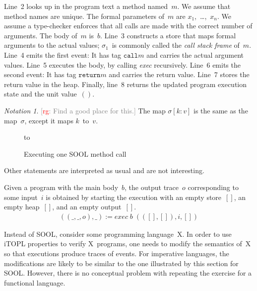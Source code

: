 \documentclass[preprint]{sigplanconf} %
\newcommand{\note}[2]{\textcolor{gray}{[\textcolor{red}{#1}: #2]}}
\newcommand{\rg}[1]{\note{rg}{#1}}
\theoremstyle{definition}
\theoremstyle{remark}
\newtheorem{notation}{Notation}
\begin{document}
Line~2 looks up in the program text a method named~$m$.
We assume that method names are unique.
The formal parameters of~$m$ are $x_1$,~\dots,~$x_n$.
We assume a type-checker enforces that all calls are made with the correct number of arguments.
The body of~$m$ is~$b$.
Line~3 constructs a store that maps formal arguments to the actual values;
$\sigma_1$~is commonly called the \emph{call stack frame} of~$m$.
Line~4 emits the first event:
It has tag $\mathtt{call}m$ and carries the actual argument values.
Line~5 executes the body, by calling \textit{exec} recursively.
Line~6 emits the second event:
It has tag $\mathtt{return}m$ and carries the return value.
Line~7 stores the return value in the heap.
Finally, line~8 returns the updated program execution state and the unit value~$()$.

\begin{notation}
\rg{Find a good place for this.}
The map $\sigma[k:v]$ is the same as the map~$\sigma$, except it maps $k$~to~$v$.
\end{notation}

\begin{figure}
\hbox to
\caption{Executing one SOOL method call}
\label{fig:exec.call}
\end{figure}

Other statements are interpreted as usual and are not interesting.

Given a program with the main body~$b$, the output trace~$o$ corresponding to some input~$i$ is obtained by starting the execution with an empty store~$[]$, an empty heap~$[]$, and an empty output~$[]$.
\begin{align}
((\_,\_,o),\_):=\mathit{exec}\;b\;(([],[]),i,[])
\end{align}

Instead of SOOL, consider some programming language~X.
In order to use iTOPL properties to verify X~programs, one needs to modify the semantics of~X so that executions produce traces of events.
For imperative languages, the modifications are likely to be similar to the one illustrated by this section for SOOL\null.
However, there is no conceptual problem with repeating the exercise for a functional language.
\end{document}
